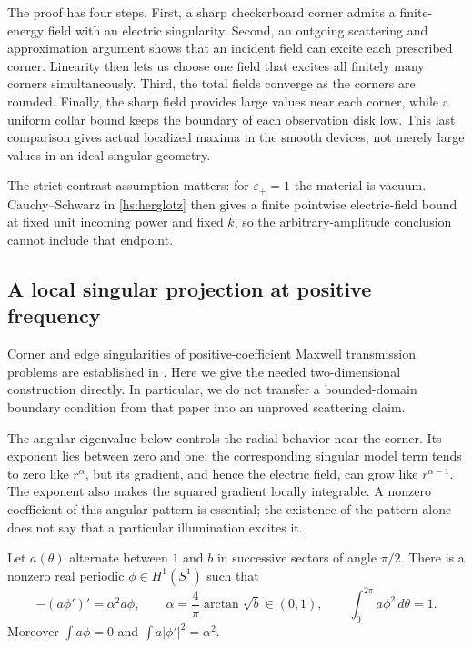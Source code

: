 The proof has four steps.  First, a sharp checkerboard corner admits a
finite-energy field with an electric singularity.  Second, an outgoing
scattering and approximation argument shows that an incident field can
excite each prescribed corner.  Linearity then lets us choose one field
that excites all finitely many corners simultaneously.  Third, the total
fields converge as the corners are rounded.  Finally, the sharp field
provides large values near each corner, while a uniform collar bound keeps
the boundary of each observation disk low.  This last comparison gives
actual localized maxima in the smooth devices, not merely large values in
an ideal singular geometry.

The strict contrast assumption matters: for $\varepsilon_+=1$ the material
is vacuum.  Cauchy--Schwarz in \eqref{hs:herglotz} then gives a finite
pointwise electric-field bound at fixed unit incoming power and fixed $k$,
so the arbitrary-amplitude conclusion cannot include that endpoint.

\subsection{A local singular projection at positive frequency}
\label{hs:local}

Corner and edge singularities of positive-coefficient Maxwell transmission
problems are established in \cite{costabel1999}.  Here we give the needed
two-dimensional construction directly.  In particular, we do not transfer
a bounded-domain boundary condition from that paper into an unproved
scattering claim.

The angular eigenvalue below controls the radial behavior near the
corner.  Its exponent lies between zero and one: the corresponding
singular model term tends to zero like $r^\alpha$, but its gradient, and hence
the electric field, can grow like $r^{\alpha-1}$.  The exponent also
makes the squared gradient locally integrable.  A nonzero coefficient of
this angular pattern is essential; the existence of the pattern alone
does not say that a particular illumination excites it.

\begin{lemma}
\label{hs:angular}
Let $a(\theta)$ alternate between $1$ and $b$ in successive sectors of
angle $\pi/2$.  There is a nonzero real periodic $\phi\in H^1(S^1)$ such
that
\begin{equation}
 -(a\phi')'=\alpha^2a\phi,
 \qquad \alpha=\frac4\pi\arctan\sqrt b\in(0,1),
 \qquad \int_0^{2\pi}a\phi^2\,d\theta=1.
 \label{hs:angular-eigenproblem}
\end{equation}
Moreover $\int a\phi=0$ and $\int a|\phi'|^2=\alpha^2$.
\end{lemma}

